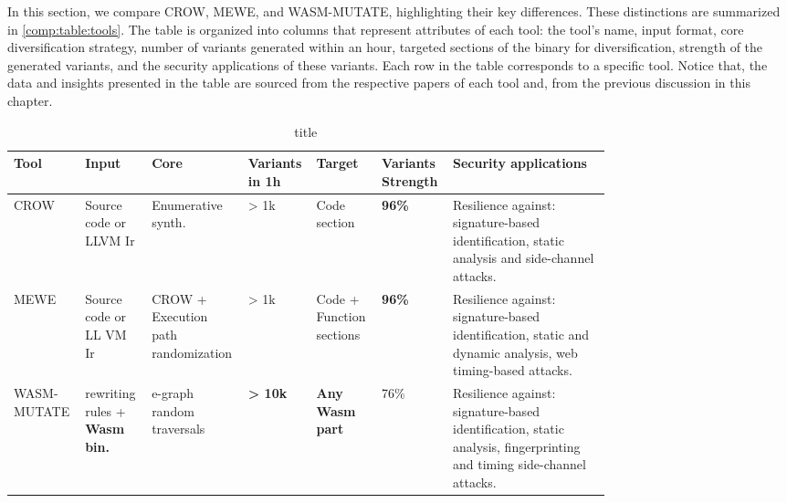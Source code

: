 

In this section, we compare CROW, MEWE, and WASM-MUTATE, highlighting their key differences. 
These distinctions are summarized in \autoref{comp:table:tools}. 
The table is organized into columns that represent attributes of each tool: the tool's name, input format, core diversification strategy, number of variants generated within an hour, targeted sections of the \Wasm binary for diversification, strength of the generated variants, and the security applications of these variants. 
Each row in the table corresponds to a specific tool. 
Notice that, the data and insights presented in the table are sourced from the respective papers of each tool and, from the previous discussion in this chapter.


\begin{landscape}
    
    \begin{table}
        \begin{tabular}{p{0.08\linewidth} | p{0.1\linewidth} | p{0.1\linewidth
            } | p{0.06\linewidth} | p{0.1\linewidth} | p{0.07\linewidth} | p{0.25\linewidth} } 
            Tool & Input & Core & Variants in 1h & Target  & Variants Strength & Security applications \\
            \hline \hline
            CROW & Source code or LLVM Ir & Enumerative synth. & > 1k & Code section  & \textbf{96\%} & Resilience against: signature-based identification, static analysis and side-channel attacks.  \\
            \hline
            MEWE & Source code or LL
            VM Ir & CROW + Execution path randomization  & > 1k & Code + Function sections  & \textbf{96\%} & Resilience against: signature-based identification, static and dynamic analysis, web timing-based attacks.  \\
            \hline
            WASM-MUTATE & rewriting rules + \textbf{Wasm bin.} & e-graph random traversals & \textbf{> 10k}  & \textbf{Any Wasm part}  & 76\% & Resilience against: signature-based identification, static analysis, fingerprinting and timing side-channel attacks. \\
            
        \end{tabular}
        \caption{title \label{comp:table:tools}}
    \end{table}
\end{landscape}

